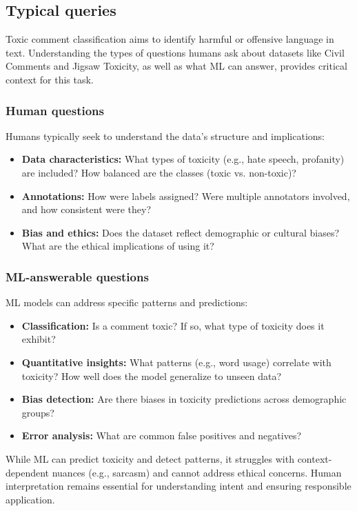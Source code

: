 \subsection{Typical queries}

Toxic comment classification aims to identify harmful or offensive language in text. Understanding the types of questions humans ask about datasets like Civil Comments and Jigsaw Toxicity, as well as what ML can answer, provides critical context for this task.

\subsubsection{Human questions}

Humans typically seek to understand the data's structure and implications:

\begin{itemize}
    \item \textbf{Data characteristics:} What types of toxicity (e.g., hate speech, profanity) are included? How balanced are the classes (toxic vs. non-toxic)?
    \item \textbf{Annotations:} How were labels assigned? Were multiple annotators involved, and how consistent were they?
    \item \textbf{Bias and ethics:} Does the dataset reflect demographic or cultural biases? What are the ethical implications of using it?
\end{itemize}

\subsubsection{ML-answerable questions}

ML models can address specific patterns and predictions:
\begin{itemize}
    \item \textbf{Classification:} Is a comment toxic? If so, what type of toxicity does it exhibit?
    \item \textbf{Quantitative insights:} What patterns (e.g., word usage) correlate with toxicity? How well does the model generalize to unseen data?
    \item \textbf{Bias detection:} Are there biases in toxicity predictions across demographic groups?
    \item \textbf{Error analysis:} What are common false positives and negatives?
\end{itemize}

While ML can predict toxicity and detect patterns, it struggles with context-dependent nuances (e.g., sarcasm) and cannot address ethical concerns. Human interpretation remains essential for understanding intent and ensuring responsible application.
